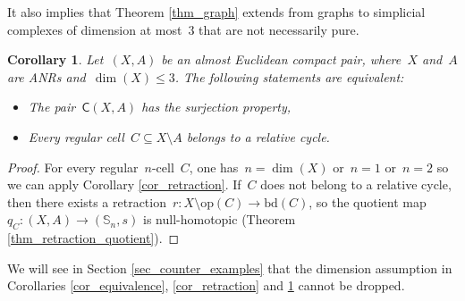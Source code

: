 \documentclass[english,11pt]{article}
\theoremstyle{plain}
\newtheorem{corollary}{Corollary}[section]
\theoremstyle{remark}
\theoremstyle{definition}
\newcommand{\bd}[1]{\mathrm{bd}(#1)}
\newcommand{\op}[1]{\mathrm{op}(#1)}
\newcommand{\Sp}{\mathbb{S}}
\newcommand{\C}[1]{\mathsf{C}(#1)}%
\begin{document}
It also implies that Theorem \ref{thm_graph} extends from graphs to simplicial complexes of dimension at most~$3$ that are not necessarily pure.
\begin{corollary}\label{cor_dim3}
Let~$(X,A)$ be an almost Euclidean compact pair, where~$X$ and~$A$ are ANRs and~$\dim(X)\leq 3$. The following statements are equivalent:
\begin{itemize}
\item The pair~$\C{X,A}$ has the surjection property,
\item Every regular cell~$C\subseteq X\setminus A$ belongs to a relative cycle.
\end{itemize}
\end{corollary}
\begin{proof}
For every regular~$n$-cell~$C$, one has~$n=\dim(X)$ or~$n=1$ or~$n=2$ so we can apply Corollary \ref{cor_retraction}. If~$C$ does not belong to a relative cycle, then there exists a retraction~$r:X\setminus \op{C}\to\bd{C}$, so the quotient map~$q_C:(X,A)\to (\Sp_n,s)$ is null-homotopic (Theorem \ref{thm_retraction_quotient}).
\end{proof}

We will see in Section \ref{sec_counter_examples} that the dimension assumption in Corollaries \ref{cor_equivalence}, \ref{cor_retraction} and \ref{cor_dim3} cannot be dropped.
\end{document}
